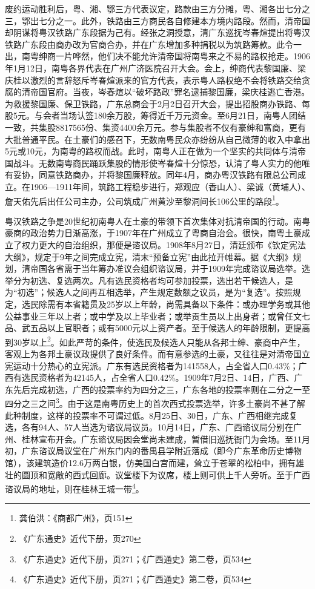 废约运动胜利后，粤、湘、鄂三方代表议定，路款由三方分摊，粤、湘各出七分之三，鄂出七分之一。此外，铁路由三方商民各自修建本方境内路段。然而，清帝国却阴谋将粤汉铁路广东段据为己有。经张之洞授意，清广东巡抚岑春煊提出将粤汉铁路广东段由商办改为官商合办，并在广东增加多种捐税以为筑路筹款。此令一出，南粤绅商一片哗然，他们决不能允许清帝国将南粤来之不易的路权抢走。1906年1月12日，南粤各界代表在广州广济医院召开大会。会上，绅商代表黎国廉、梁庆桂以激烈的言辞怒斥岑春煊派来的官方代表，表示粤人路权绝不会将铁路交给贪腐的清帝国官府。当夜，岑春煊以“破坏路政”罪名逮捕黎国廉，梁庆桂逃亡香港。为救援黎国廉、保卫铁路，广东总商会于2月2日召开大会，提出招股商办铁路、每股5元。与会者当场认签180余万股，筹得近千万元资金。至6月21日，南粤人团结一致，共集股8817565份、集资4400余万元。参与集股者不仅有豪绅和富商，更有大批普通平民。在土豪们的感召下，无数南粤民众亦纷纷从自己微薄的收入中拿出5元或10元，为南粤的路权而战。此时，南粤人正在做为一个坚实的共同体与清帝国战斗。无数南粤商民踊跃集股的情形使岑春煊十分惊恐，认清了粤人实力的他唯有妥协，同意铁路商办，并将黎国廉释放。同年4月，商办粤汉铁路有限总公司成立。在1906—1911年间，筑路工程稳步进行，郑观应（香山人）、梁诚（黄埔人）、詹天佑先后出任公司主办，公司筑成广州黄沙至黎洞间长106公里的路段\footnote{龚伯洪：《商都广州》，页151}。

粤汉铁路之争是20世纪初南粤人在土豪的带领下首次集体对抗清帝国的行动。南粤豪商的政治势力日渐高涨，于1907年在广州成立了粤商自治会。很快，南粤土豪成立了权力更大的自治组织，那便是谘议局。1908年8月27日，清廷颁布《钦定宪法大纲》，规定于9年之间完成立宪，清末“预备立宪”由此拉开帷幕。据《大纲》规划，清帝国各省需于当年筹办准议会组织谘议局，并于1909年完成谘议局选举。选举分为初选、复选两次。凡有选民资格者均可参加投票，选出若干候选人，是为“初选”；候选人之间再互相选举，产生规定数额之议员，是为“复选”。按照规定，选民除需有本省籍贯及25岁以上年龄，尚需具备以下条件：或办理学务或其他公益事业三年以上者；或中学及以上毕业者；或举贡生员以上出身者；或曾任文七品、武五品以上官职者；或有5000元以上资产者。至于候选人的年龄限制，更提高到30岁以上\footnote{《广东通史》近代下册，页270}。如此严苛的条件，使选民及候选人只能从各邦士绅、豪商中产生，客观上为各邦土豪议政提供了良好条件。而有意参选的土豪，又往往是对清帝国立宪运动十分热心的立宪派。广东有选民资格者为141558人，占全省人口0.43\%；广西有选民资格者为42145人，占全省人口0.42\%。1909年7月2日、14日，广西、广东先后完成初选，广西的投票率约为四分之三，广东各地的投票率则在二分之一至四分之三之间\footnote{《广东通史》近代下册，页271；《广西通史》第二卷，页534}。由于这是南粤历史上的首次西式投票选举，许多土豪尚不甚了解此种制度，这样的投票率不可谓过低。8月25日、30日，广东、广西相继完成复选，各有94人、57人当选为谘议局议员。10月14日，广东、广西谘议局分别在广州、桂林宣布开会。广东谘议局因会堂尚未建成，暂借旧巡抚衙门为会场。至11月初，广东谘议局议堂在广州东门内的番禺县学附近落成（即今广东革命历史博物馆），该建筑造价12.6万两白银，仿美国白宫而建，耸立于苍翠的松柏中，拥有雄壮的圆顶和宽敞的西式回廊。议堂楼下为议席，楼上则可供上千人旁听。至于广西谘议局的地址，则在桂林王城一带\footnote{《广东通史》近代下册，页271；《广西通史》第二卷，页534}。

